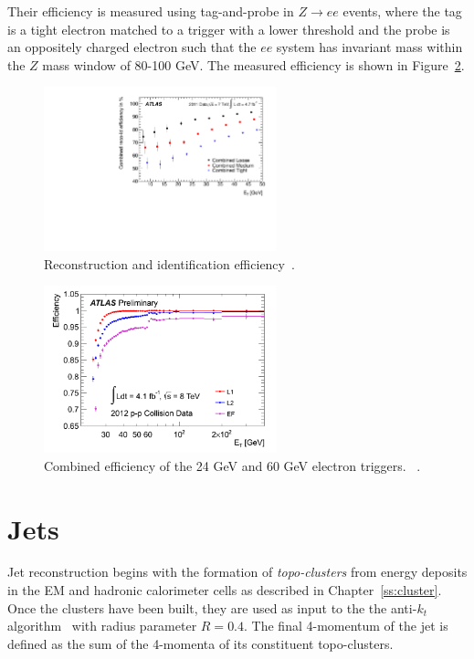  Their efficiency is measured using tag-and-probe in $Z\rightarrow ee$ events, where the tag is a tight electron matched to a trigger with a lower threshold and the probe is an oppositely charged electron such that the $ee$ system has invariant mass within the $Z$ mass window of 80-100 GeV. The measured efficiency is shown in Figure~\ref{fig:eltrigger}. 

\begin{figure}[hp]
\centering
\includegraphics[width=0.6\textwidth]{fig/obj/electronID.pdf}
\caption{Reconstruction and identification efficiency~\cite{Aad:2014fxa}.}
\label{fig:electronID}
\end{figure}
\begin{figure}[hp]
\centering
\includegraphics[width=0.6\textwidth]{fig/obj/eltrigger.png}
\caption{Combined efficiency of the 24 GeV and 60 GeV electron triggers. ~\cite{eltrig}.}
\label{fig:eltrigger}
\end{figure}

\section{Jets}
Jet reconstruction begins with the formation of \emph{topo-clusters} from energy deposits in the EM and hadronic calorimeter cells as described in Chapter~\ref{ss:cluster}. Once the clusters have been built, they are used as input to the the anti-$k_t$ algorithm~\cite{antikt1} with radius parameter $R=0.4$. The final 4-momentum of the jet is defined as the sum of the 4-momenta of its constituent topo-clusters. 

